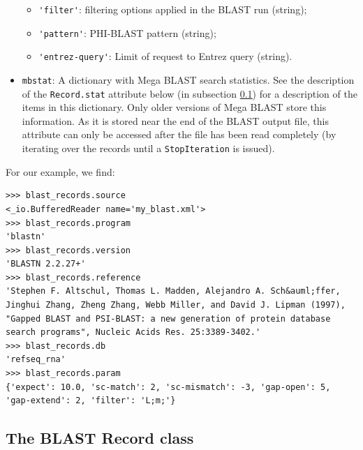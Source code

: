 \begin{itemize}
\begin{itemize}
\item \verb|'filter'|: filtering options applied in the BLAST run (string);
\item \verb|'pattern'|: PHI-BLAST pattern (string);
\item \verb|'entrez-query'|: Limit of request to Entrez query (string).
\end{itemize}
\item \verb|mbstat|: A dictionary with Mega BLAST search statistics. See the description of the \verb|Record.stat| attribute below (in subsection \ref{subsec:blast-record}) for a description of the items in this dictionary. Only older versions of Mega BLAST store this information. As it is stored near the end of the BLAST output file, this attribute can only be accessed after the file has been read completely (by iterating over the records until a \verb|StopIteration| is issued).
\end{itemize}

For our example, we find:
\begin{verbatim}
>>> blast_records.source
<_io.BufferedReader name='my_blast.xml'>
>>> blast_records.program
'blastn'
>>> blast_records.version
'BLASTN 2.2.27+'
>>> blast_records.reference
'Stephen F. Altschul, Thomas L. Madden, Alejandro A. Sch&auml;ffer, Jinghui Zhang, Zheng Zhang, Webb Miller, and David J. Lipman (1997), "Gapped BLAST and PSI-BLAST: a new generation of protein database search programs", Nucleic Acids Res. 25:3389-3402.'
>>> blast_records.db
'refseq_rna'
>>> blast_records.param
{'expect': 10.0, 'sc-match': 2, 'sc-mismatch': -3, 'gap-open': 5, 'gap-extend': 2, 'filter': 'L;m;'}
\end{verbatim}

\subsection{The BLAST Record class}
\label{subsec:blast-record}

